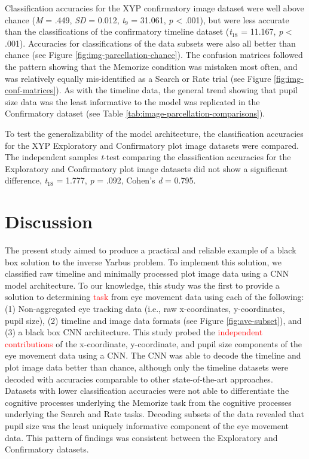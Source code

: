 \documentclass[
  english,
  man, donotrepeattitle,floatsintext]{apa6}
\begin{document}
Classification accuracies for the XYP confirmatory image dataset were well above chance (\emph{M} = .449, \emph{SD} = 0.012, \emph{t}\(_{9}\) = 31.061, \emph{p} \textless{} .001), but were less accurate than the classifications of the confirmatory timeline dataset (\emph{t}\(_{18}\) = 11.167, \emph{p} \textless{} .001). Accuracies for classifications of the data subsets were also all better than chance (see Figure \ref{fig:img-parcellation-chance}). The confusion matrices followed the pattern showing that the Memorize condition was mistaken most often, and was relatively equally mis-identified as a Search or Rate trial (see Figure \ref{fig:img-conf-matrices}). As with the timeline data, the general trend showing that pupil size data was the least informative to the model was replicated in the Confirmatory dataset (see Table \ref{tab:image-parcellation-comparisons}).

To test the generalizability of the model architecture, the classification accuracies for the XYP Exploratory and Confirmatory plot image datasets were compared. The independent samples \emph{t}-test comparing the classification accuracies for the Exploratory and Confirmatory plot image datasets did not show a significant difference, \emph{t}\(_{18}\) = 1.777, \emph{p} = .092, Cohen's \emph{d} = 0.795.

\section{Discussion}

The present study aimed to produce a practical and reliable example of a black box solution to the inverse Yarbus problem. To implement this solution, we classified raw timeline and minimally processed plot image data using a CNN model architecture. To our knowledge, this study was the first to provide a solution to determining \textcolor{red}{task} from eye movement data using each of the following: (1) Non-aggregated eye tracking data (i.e., raw x-coordinates, y-coordinates, pupil size), (2) timeline and image data formats (see Figure \ref{fig:ave-subset}), and (3) a black box CNN architecture. This study probed the \textcolor{red}{independent contributions} of the x-coordinate, y-coordinate, and pupil size components of the eye movement data using a CNN. The CNN was able to decode the timeline and plot image data better than chance, although only the timeline datasets were decoded with accuracies comparable to other state-of-the-art approaches. Datasets with lower classification accuracies were not able to differentiate the cognitive processes underlying the Memorize task from the cognitive processes underlying the Search and Rate tasks. Decoding subsets of the data revealed that pupil size was the least uniquely informative component of the eye movement data. This pattern of findings was consistent between the Exploratory and Confirmatory datasets.
\end{document}
